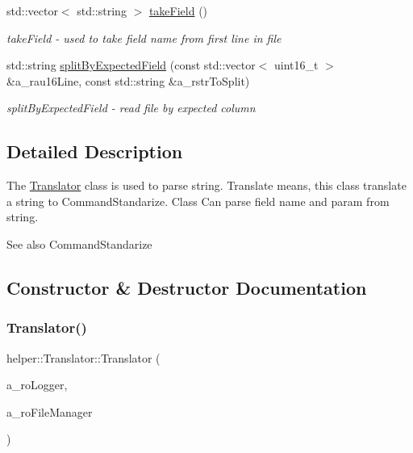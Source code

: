\begin{DoxyCompactItemize}
std\+::vector$<$ std\+::string $>$ \mbox{\hyperlink{classhelper_1_1_translator_a87c4cdc109a5ab827e9b91364cb5266f}{take\+Field}} ()
\begin{DoxyCompactList}\small\item\em take\+Field -\/ used to take field name from first line in file \end{DoxyCompactList}\item 
std\+::string \mbox{\hyperlink{classhelper_1_1_translator_a4069ff26b6329f5c6a70ccbfe752f812}{split\+By\+Expected\+Field}} (const std\+::vector$<$ uint16\+\_\+t $>$ \&a\+\_\+rau16\+Line, const std\+::string \&a\+\_\+rstr\+To\+Split)
\begin{DoxyCompactList}\small\item\em split\+By\+Expected\+Field -\/ read file by expected column \end{DoxyCompactList}\end{DoxyCompactItemize}


\subsection{Detailed Description}
The \mbox{\hyperlink{classhelper_1_1_translator}{Translator}} class is used to parse string. Translate means, this class translate a string to Command\+Standarize. Class Can parse field name and param from string. 

\begin{DoxySeeAlso}{See also}
Command\+Standarize 
\end{DoxySeeAlso}


\subsection{Constructor \& Destructor Documentation}
\mbox{\label{classhelper_1_1_translator_a5a7565a5da4276aba028c587ee212913}} 
\subsubsection{\texorpdfstring{Translator()}{Translator()}}
{\footnotesize\ttfamily helper\+::\+Translator\+::\+Translator (\begin{DoxyParamCaption}\item[{const \mbox{\hyperlink{classi_logger}{i\+Logger}} \&}]{a\+\_\+ro\+Logger,  }\item[{\mbox{\hyperlink{classi_file_manager}{i\+File\+Manager}} \&}]{a\+\_\+ro\+File\+Manager }\end{DoxyParamCaption})\hspace{0.3cm}{\ttfamily [explicit]}}



